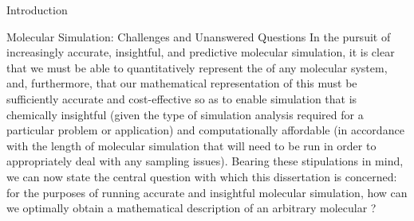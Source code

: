 \begin{chapter}{Introduction}
\begin{section}{Molecular Simulation: Challenges and Unanswered Questions}
In the pursuit of increasingly accurate, insightful, and predictive molecular
simulation, it is clear that we must be able to quantitatively represent the
\pes of any molecular system, and, furthermore, that our mathematical
representation of this \pes must be sufficiently accurate and cost-effective so
as to enable simulation that is chemically insightful (given the type of
simulation analysis required for a particular problem or application) and
computationally affordable (in accordance with the length of molecular simulation that will
need to be run in order to appropriately deal with any sampling issues). 
Bearing these stipulations in mind, we can now state the central
question with which this dissertation is concerned: for the purposes of running
accurate and insightful molecular simulation, how can we optimally
obtain a mathematical description of an arbitrary molecular \pes?

\end{section}





\end{chapter}
